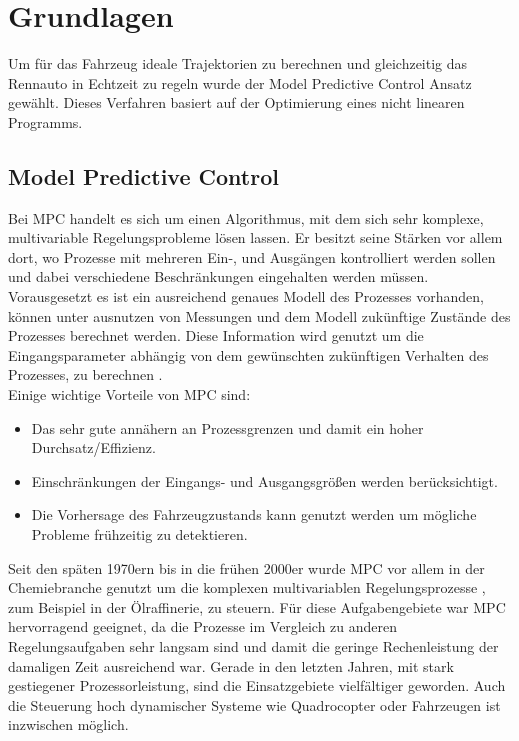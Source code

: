\documentclass{like}
\begin{document}
\chapter{Grundlagen}
Um für das Fahrzeug ideale Trajektorien zu berechnen und gleichzeitig das Rennauto in Echtzeit zu regeln wurde der Model Predictive Control Ansatz gewählt. Dieses Verfahren basiert auf der Optimierung eines nicht linearen Programms.
 
\section{Model Predictive Control}
Bei \ac{MPC} handelt es sich um einen Algorithmus, mit dem sich sehr komplexe, multivariable Regelungsprobleme lösen lassen. Er besitzt seine Stärken vor allem dort, wo Prozesse mit mehreren Ein-, und Ausgängen kontrolliert werden sollen und dabei verschiedene Beschränkungen eingehalten werden müssen. Vorausgesetzt es ist ein ausreichend genaues Modell des Prozesses vorhanden, können unter ausnutzen von Messungen und dem Modell zukünftige Zustände des Prozesses berechnet werden. Diese Information wird genutzt um die Eingangsparameter abhängig von dem gewünschten zukünftigen Verhalten des Prozesses, zu berechnen \cite{seborg2010process}. \\
Einige wichtige Vorteile von \ac{MPC} sind: 
\begin{itemize}
	\item Das sehr gute annähern an Prozessgrenzen und damit ein hoher Durchsatz/Effizienz.
	\item Einschränkungen der Eingangs- und Ausgangsgrößen werden berücksichtigt.
	\item Die Vorhersage des Fahrzeugzustands kann genutzt werden um mögliche Probleme frühzeitig zu detektieren.
\end{itemize}
Seit den späten 1970ern bis in die frühen 2000er wurde \ac{MPC} vor allem in der Chemiebranche genutzt um die komplexen multivariablen Regelungsprozesse , zum Beispiel in der Ölraffinerie, zu steuern. Für diese Aufgabengebiete war \acl{MPC} hervorragend geeignet, da die Prozesse im Vergleich zu anderen Regelungsaufgaben sehr langsam sind und damit die geringe Rechenleistung der damaligen Zeit ausreichend war. 
Gerade in den letzten Jahren, mit stark gestiegener Prozessorleistung, sind die Einsatzgebiete vielfältiger geworden. Auch die Steuerung hoch dynamischer Systeme wie Quadrocopter \cite{quadcopterMpc} oder Fahrzeugen \cite{carMPC} ist inzwischen möglich. 
\end{document}
